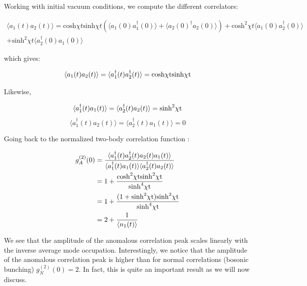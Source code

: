 Working with initial vacuum conditions, we compute the different correlators:

\begin{equation}
\begin{split}
   \langle a_1(t) a_2(t) \rangle = \mathrm{cosh} \chi t \mathrm{sinh} \chi t (\langle a_1(0) a_1^{\dagger}(0) \rangle+ \langle a_2(0)^{\dagger} a_2(0) \rangle) + \mathrm{cosh}^2 \chi t \langle a_1(0) a_2^{\dagger}(0) \rangle \\
   + \mathrm{sinh}^2 \chi t \langle a_2^{\dagger}(0) a_1(0) \rangle 
\end{split}
\end{equation}

which gives:

\begin{equation}
    \langle a_1(t) a_2(t) \rangle = \langle a_1^{\dagger}(t) a_2^{\dagger}(t) \rangle = \rm{cosh} \chi t \rm{sinh} \chi t
\end{equation}

Likewise,

\begin{equation}
     \langle a_1^{\dagger}(t) a_1(t) \rangle = \langle a_2^{\dagger}(t) a_2(t) \rangle = \rm{sinh}^2 \chi t
\end{equation}
\begin{equation}
    \langle a_1^{\dagger}(t) a_2(t) \rangle =  \langle a_2^{\dagger}(t) a_1(t) \rangle = 0
\end{equation}

Going back to the normalized two-body correlation function :

\begin{equation}
\begin{aligned}
      g^{(2)}_A(0) & = \frac{\langle a_1^{\dagger}(t) a_2^{\dagger}(t) a_2(t) a_1(t) \rangle}{\langle a_1^{\dagger}(t) a_1(t) \rangle \langle a_2^{\dagger}(t) a_2(t) \rangle} \\
      & = 1 + \frac{\rm{cosh}^2 \chi t \rm{sinh}^2 \chi t}{\rm{sinh}^4 \chi t} \\
      & = 1+\frac{(1+\rm{sinh}^2 \chi t)\rm{sinh}^2 \chi t}{\rm{sinh}^4 \chi t} \\
      & = 2 + \frac{1}{\langle n_1(t) \rangle} 
      \label{eq:amp_g2_A}
\end{aligned}
\end{equation}

We see that the amplitude of the anomalous correlation peak scales linearly with the inverse average mode occupation. Interestingly, we notice that the amplitude of the anomalous correlation peak is higher than for normal correlations (bosonic bunching) $g^{(2)}_N (0)=2$. In fact, this is quite an important result as we will now discuss.

